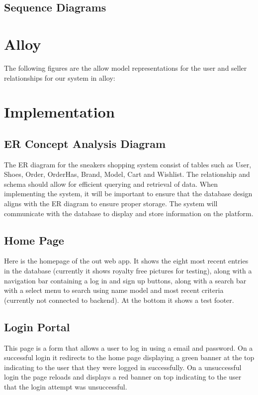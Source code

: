 \subsection{Sequence Diagrams}
\section{Alloy}
The following figures are the allow model representations for the user and seller relationships for our system in alloy:
\section{Implementation}
\subsection{ER Concept Analysis Diagram}
\hspace{1cm} The ER diagram for the sneakers shopping system consist of tables such as User, Shoes, Order,
OrderHas, Brand, Model, Cart and Wishlist. The relationship and schema should allow for efficient
querying and retrieval of data. When implementing the system, it will be important to ensure that the
database design aligns with the ER diagram to ensure proper storage. The system will communicate with
the database to display and store information on the platform.
\subsection{Home Page}
Here is the homepage of the out web app. It shows the eight most recent entries in the database (currently it shows royalty free pictures for testing), along with a navigation bar containing a log in and sign up buttons, along with a search bar with a select menu to search using name model and most recent criteria (currently not connected to backend). At the bottom it shows a test footer.
\subsection{Login Portal}
This page is a form that allows a user to log in using a email and password. On a successful login it redirects to the home page displaying a green banner at the top indicating to the user that they were logged in successfully. On a unsuccessful login the page reloads and displays a red banner on top indicating to the user that the login attempt was unsuccessful.
